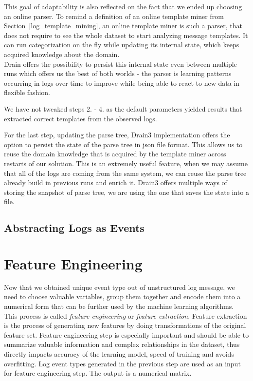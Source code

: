 This goal of adaptability is also reflected on the fact that we ended up choosing an online parser.
To remind a definition of an online template miner from Section~\ref{log_template_mining}, an online template miner is such a parser, that does not require to see the whole dataset to start analyzing message templates. It can run categorization on the fly while updating its internal state, which keeps acquired knowledge about the domain.\\
Drain offers the possibility to persist this internal state even between multiple runs which offers us the best of both worlds - the parser is learning patterns occurring in logs over time to improve while being able to react to new data in flexible fashion.

We have not tweaked steps 2. - 4. as the default parameters \cite{ibmdrain3} yielded results that extracted correct templates from the observed logs.

For the last step, updating the parse tree, Drain3 implementation offers the option to persist the state of the parse tree in json file format. This allows us to reuse the  domain knowledge that is acquired by the template miner across restarts of our solution.
This is an extremely useful feature, when we may assume that all of the logs are coming from the same system, we can reuse the parse tree already build in previous runs and enrich it.
Drain3 offers multiple ways of storing the snapshot of parse tree, we are using the one that saves the state into a file.

\subsection{Abstracting Logs as Events}


\section{Feature Engineering}
\label{section:featureEngineering}
Now that we obtained unique event type out of unstructured log message, we need to choose valuable variables, group them together and encode them into a numerical form that can be further used by the machine learning algorithms.  This process is called \textit{feature engineering} or \textit{feature extraction}. Feature extraction is the process of generating new features by doing transformations of the original feature set.  
Feature engineering step is especially important and should be able to summarize valuable information and complex relationships in the dataset, thus directly impacts accuracy of the learning model, speed of training and avoids overfitting. Log event types generated in the previous step are used as an input for feature engineering step. The output is a numerical matrix. 

